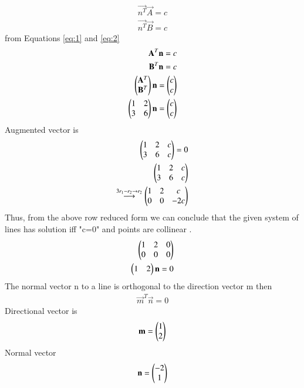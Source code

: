 \documentclass[journal,12pt,twocolumn]{IEEEtran}
\begin{document}
\begin {align}
\vec{n^T} \vec {A}=c \label{eq:1} \\
\vec{n^T} \vec {B}=c  \label{eq:2} 
\end{align}
from Equations \eqref{eq:1} and \eqref{eq:2} \\
\begin{align}
    \mathbf{A}^T \mathbf {n}=c \\
    \mathbf{B}^T \mathbf {n}=c  \\
    \begin{pmatrix}\mathbf{A}^T \\ \mathbf{B}^T\end{pmatrix} \mathbf{n}=\begin{pmatrix}c \\ c\end{pmatrix} \\
    \begin{pmatrix}1 &2 \\ 3&6\end{pmatrix} \mathbf{n}=\begin{pmatrix}c\\c\end{pmatrix}
\end{align}
Augmented vector is 
\begin{align}
    \begin{pmatrix}1&2&c\\3&6&c\end{pmatrix}=0 \\
    \begin{pmatrix} 1 &  2 & c \\ 3&  6& c \end{pmatrix} \\ \overset{3r_1-r_2\rightarrow r_2}{\longrightarrow} \begin{pmatrix} 1 &  2& c\\0 &  0 & -2c\end{pmatrix}
\end{align}
Thus, from the above row reduced form we can conclude that the given system of lines has solution iff "c=0" and points are collinear .
\begin{align}
    \begin{pmatrix} 1 &  2& 0\\0 &  0 & 0\end{pmatrix} \\
    \begin{pmatrix}1&2\end{pmatrix}\mathbf{n}=0
\end{align}
The normal vector n to a line is  orthogonal to the direction vector m then \\
\begin{align}
    \vec{m}^T\vec{n}=0
\end{align}
    Directional vector is 
\begin{align}
    \mathbf{m} = \begin{pmatrix}1 \\ 2\end{pmatrix}
\end{align}
    Normal vector 
\begin{align}
    \mathbf{n}= \begin{pmatrix}-2\\1\end{pmatrix}
\end{align}
\end{document}
